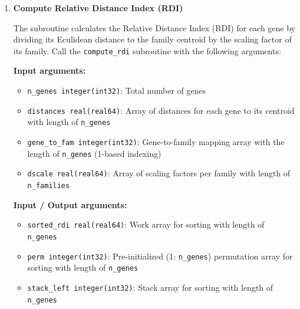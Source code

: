 \begin{enumerate}
\begin{enumerate}
            \item \textbf{Compute Relative Distance Index (RDI)}
                  
                  The subroutine calculates the Relative Distance Index (RDI) for each
                  gene by dividing its Eculidean distance to the family centroid by the
                  scaling factor of its family. Call the \texttt{compute\_rdi} subroutine
                  with the following arguments:
                  
                  \textbf{Input arguments:}
                  \begin{itemize}
                    \item \texttt{n\_genes integer(int32)}: Total number of genes
                          
                    \item \texttt{distances real(real64)}: Array of distances for each
                          gene to its centroid with length of \texttt{n\_genes}
                          
                    \item \texttt{gene\_to\_fam integer(int32)}: Gene-to-family mapping
                          array with the length of \texttt{n\_genes} (1-based indexing)
                          
                    \item \texttt{dscale real(real64)}: Array of scaling factors per
                          family with length of \texttt{n\_families}
                  \end{itemize}
                  
                  \textbf{Input / Output arguments:}
                  \begin{itemize}
                    \item \texttt{sorted\_rdi real(real64)}: Work array for sorting with
                          length of \texttt{n\_genes}
                          
                    \item \texttt{perm integer(int32)}: Pre-initialized (1: \texttt{n\_genes})
                          permutation array for sorting with length of \texttt{n\_genes}
                          
                    \item \texttt{stack\_left integer(int32)}: Stack array for sorting
                          with length of \texttt{n\_genes}
                          

\end{itemize}
\end{enumerate}
\end{enumerate}
